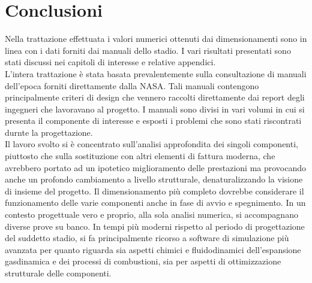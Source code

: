 \section{Conclusioni}
\label{sec:conclusioni}
Nella trattazione effettuata i valori numerici ottenuti dai dimensionamenti sono in linea con i dati forniti dai manuali dello stadio. I vari risultati presentati sono stati discussi nei capitoli di interesse e relative appendici.\\
L'intera trattazione è stata basata prevalentemente sulla consultazione di manuali dell'epoca forniti direttamente dalla NASA. Tali manuali contengono principalmente criteri di design che vennero raccolti direttamente dai report degli ingegneri che lavoravano al progetto. I manuali sono divisi in vari volumi in cui si presenta il componente di interesse e esposti i problemi che sono stati riscontrati durnte la progettazione.\\
Il lavoro svolto si è concentrato sull'analisi approfondita dei singoli componenti, piuttosto che sulla sostituzione con altri elementi di fattura moderna, che avrebbero portato ad un ipotetico miglioramento delle prestazioni ma provocando anche un profondo cambiamento a livello strutturale, denaturalizzando la visione di insieme del progetto.
Il dimensionamento più completo dovrebbe considerare il funzionamento delle varie componenti anche in fase di avvio e spegnimento. In un contesto progettuale vero e proprio, alla sola analisi numerica, si accompagnano diverse prove su banco. In tempi più moderni rispetto al periodo di progettazione del suddetto stadio, si fa principalmente ricorso a software di simulazione più avanzata per quanto riguarda sia aspetti chimici e fluidodinamici dell'espansione gasdinamica e dei processi di  combustioni, sia per aspetti di ottimizzazione strutturale delle componenti. 